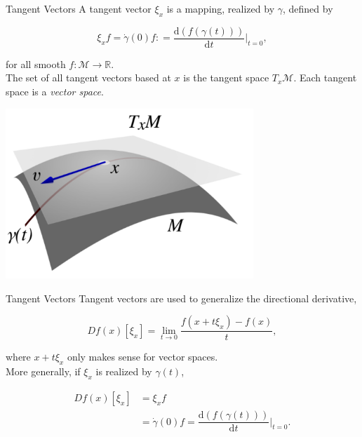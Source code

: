 \documentclass[xcolor=dvipsnames,t]{beamer} %
\newcommand{\reals}{\mathbb{R}}
\newcommand{\drm}{\mathrm{d}}
\newcommand{\defeq}{\mathrel{\mathop:}=}
\begin{document}
\begin{frame}{Tangent Vectors}
   A tangent vector $\xi_x$ is a mapping, realized by $\gamma$, defined by %
   
   \[ \xi_x f = \dot{\gamma}(0)f \defeq \dfrac{\drm(f(\gamma(t)))}{\drm t}\biggr|_{t=0}, \] 
   
   \noindent for all smooth $f:\mathcal{M}\to\reals$.\\

   \noindent The set of all tangent vectors based at $x$ is the tangent space $T_x\mathcal{M}$.  Each tangent space is a \emph{vector space}.  %

   \begin{center}
      \includegraphics[width=0.7\textwidth]{figures/tangent_space.pdf}
   \end{center}
\end{frame}


\begin{frame}{Tangent Vectors}
   Tangent vectors are used to generalize the directional derivative,

   \[ Df(x)[\xi_x] = \lim_{t\to 0} \dfrac{f(x+t\xi_x)-f(x)}{t}, \] 
   
   \noindent where $x+t\xi_x$ only makes sense for vector spaces.\\[.5em]

   \noindent More generally, if $\xi_x$ is realized by $\gamma(t)$,

   \begin{align*} Df(x)[\xi_x] &= \xi_xf\\
                               &= \dot{\gamma}(0)f = \dfrac{\drm(f(\gamma(t)))}{\drm t}\biggr|_{t=0}.
                                 \end{align*}

\end{frame}
\end{document}
